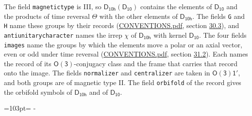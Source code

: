 \documentclass[10pt,a4paper]{article}
\newcommand{\needspace}[1]{\par\penalty-100\begingroup\dimen0=#1\relax\dimen2=\pagegoal
  \advance\dimen2-\pagetotal\ifdim\dimen0>\dimen2\relax\ifdim\dimen2>0pt\vfil\break\fi\fi
  \endgroup}
\numberwithin{equation}{section}
\newcommand{\grp}[1]{\mathsf{#1}}
\begin{document}
The field \texttt{magnetictype} is III, so $\grp{D_{10h}}(\grp{D_{10}})$ contains the elements of $\grp{D_{10}}$ and the products of time reversal $\varTheta$ with the other elements of $\grp{D_{10h}}$. The fields \texttt{G} and \texttt{H} name these groups by their records (\href{../../CONVENTIONS.pdf}{CONVENTIONS.pdf}, section \href{../../CONVENTIONS.pdf\#conv.30.3}{30.3}), and \texttt{antiunitarycharacter} names the irrep $\chi$ of $\grp{D_{10h}}$ with kernel $\grp{D_{10}}$. The four fields \texttt{images} name the groups by which the elements move a polar or an axial vector, even or odd under time reversal (\href{../../CONVENTIONS.pdf}{CONVENTIONS.pdf}, section \href{../../CONVENTIONS.pdf\#conv.31.2}{31.2}). Each names the record of its $\grp{O(3)}$-conjugacy class and the frame that carries that record onto the image. The fields \texttt{normalizer} and \texttt{centralizer} are taken in $\grp{O(3)1'}$, and both groups are of magnetic type II. The field \texttt{orbifold} of the record gives the orbifold symbols of $\grp{D_{10h}}$ and of $\grp{D_{10}}$.
\needspace{103pt}
\end{document}
